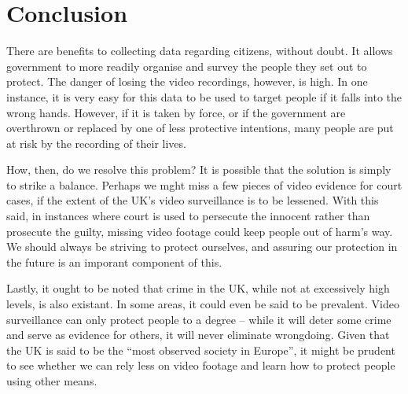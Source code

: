 \documentclass[10pt, draft]{article}
\begin{document}
\section{Conclusion}\par
There are benefits to collecting data regarding citizens, without doubt. It allows government to more readily organise and survey the people they set out to protect. The danger of losing the video recordings, however, is high. In one instance, it is very easy for this data to be used to target people if it falls into the wrong hands. However, if it is taken by force, or if the government are overthrown or replaced by one of less protective intentions, many people are put at risk by the recording of their lives. \par
How, then, do we resolve this problem? It is possible that the solution is simply to strike a balance. Perhaps we mght miss a few pieces of video evidence for court cases, if the extent of the UK's video surveillance is to be lessened. With this said, in instances where court is used to persecute the innocent rather than prosecute the guilty, missing video footage could keep people out of harm's way. We should always be striving to protect ourselves, and assuring our protection in the future is an imporant component of this. \par
Lastly, it ought to be noted that crime in the UK, while not at excessively high levels, is also existant. In some areas, it could even be said to be prevalent. Video surveillance can only protect people to a degree -- while it will deter some crime and serve as evidence for others, it will never eliminate wrongdoing. Given that the UK is said to be the ``most observed society in Europe'', it might be prudent to see whether we can rely less on video footage and learn how to protect people using other means. 

\end{document}
